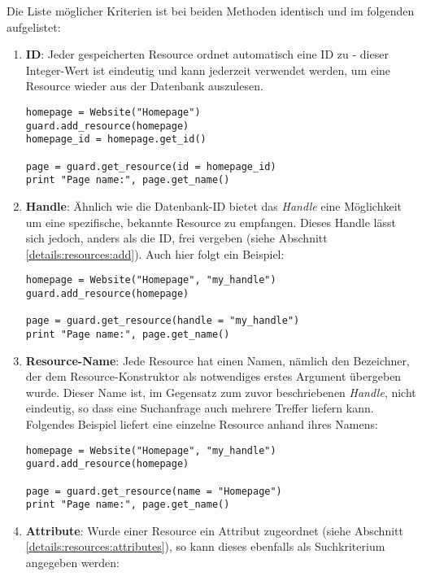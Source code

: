 Die Liste möglicher Kriterien ist bei beiden Methoden identisch und im 
folgenden aufgelistet:

\begin{enumerate}
\item {\bf ID}: Jeder gespeicherten Resource ordnet \product automatisch
eine ID zu - dieser Integer-Wert ist eindeutig und kann jederzeit verwendet 
werden, um eine Resource wieder aus der Datenbank auszulesen.

\begin{lstlisting}
homepage = Website("Homepage")
guard.add_resource(homepage)
homepage_id = homepage.get_id()

page = guard.get_resource(id = homepage_id)
print "Page name:", page.get_name()
\end{lstlisting}

\item {\bf Handle}: Ähnlich wie die Datenbank-ID bietet das {\it Handle} 
eine Möglichkeit um eine spezifische, bekannte Resource zu empfangen. Dieses 
Handle lässt sich jedoch, anders als die ID, frei vergeben (siehe 
Abschnitt \ref{details:resources:add}). Auch hier folgt ein Beispiel:

\begin{lstlisting}
homepage = Website("Homepage", "my_handle")
guard.add_resource(homepage)

page = guard.get_resource(handle = "my_handle")
print "Page name:", page.get_name()
\end{lstlisting}

\item {\bf Resource-Name}: Jede Resource hat einen Namen, nämlich den 
Bezeichner, der dem Resource-Konstruktor als notwendiges erstes Argument 
übergeben wurde. Dieser Name ist, im Gegensatz zum zuvor beschriebenen 
{\it Handle}, nicht eindeutig, so dass eine Suchanfrage auch mehrere Treffer 
liefern kann.
Folgendes Beispiel liefert eine einzelne Resource anhand ihres Namens:

\begin{lstlisting}
homepage = Website("Homepage", "my_handle")
guard.add_resource(homepage)

page = guard.get_resource(name = "Homepage")
print "Page name:", page.get_name()
\end{lstlisting}

\item {\bf Attribute}: Wurde einer Resource ein Attribut zugeordnet
(siehe Abschnitt \ref{details:resources:attributes}), so kann dieses 
ebenfalls als Suchkriterium angegeben werden:


\end{enumerate}

